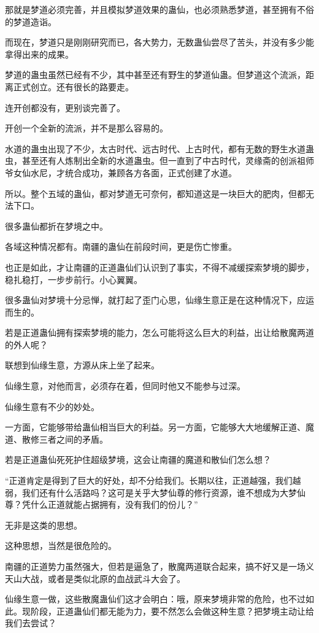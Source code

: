 \begin{this_body}
那就是梦道必须完善，并且模拟梦道效果的蛊仙，也必须熟悉梦道，甚至拥有不俗的梦道造诣。

而现在，梦道只是刚刚研究而已，各大势力，无数蛊仙尝尽了苦头，并没有多少能拿得出来的成果。

梦道的蛊虫虽然已经有不少，其中甚至还有野生的梦道仙蛊。但梦道这个流派，距离正式创立。还有很长的路要走。

连开创都没有，更别谈完善了。

开创一个全新的流派，并不是那么容易的。

水道的蛊虫出现了不少，太古时代、远古时代、上古时代，都有无数的野生水道蛊虫，甚至还有人炼制出全新的水道蛊虫。但一直到了中古时代，灵缘斋的创派祖师爷女仙水尼，才统合成功，兼顾各方各面，正式创建了水道。

所以。整个五域的蛊仙，都对梦道无可奈何，都知道这是一块巨大的肥肉，但都无法下口。

很多蛊仙都折在梦境之中。

各域这种情况都有。南疆的蛊仙在前段时间，更是伤亡惨重。

也正是如此，才让南疆的正道蛊仙们认识到了事实，不得不减缓探索梦境的脚步，稳扎稳打，一步步前行。小心翼翼。

很多蛊仙对梦境十分忌惮，就打起了歪门心思，仙缘生意正是在这种情况下，应运而生的。

若是正道蛊仙拥有探索梦境的能力，怎么可能将这么巨大的利益，出让给散魔两道的外人呢？

联想到仙缘生意，方源从床上坐了起来。

仙缘生意，对他而言，必须存在着，但同时他又不能参与过深。

仙缘生意有不少的妙处。

一方面，它能够带给蛊仙相当巨大的利益。另一方面，它能够大大地缓解正道、魔道、散修三者之间的矛盾。

若是正道蛊仙死死护住超级梦境，这会让南疆的魔道和散仙们怎么想？

“正道肯定是得到了巨大的好处，却不分给我们。长期以往，正道越强，我们越弱，我们还有什么活路吗？这可是关乎大梦仙尊的修行资源，谁不想成为大梦仙尊？凭什么正道就能占据拥有，没有我们的份儿？”

无非是这类的思想。

这种思想，当然是很危险的。

南疆的正道势力虽然强大，但若是逼急了，散魔两道联合起来，搞不好又是一场义天山大战，或者是类似北原的血战武斗大会了。

仙缘生意一做，这些散魔蛊仙们这才会明白：哦，原来梦境非常的危险，也不过如此。现阶段，正道蛊仙们都无能为力，要不然怎么会做这种生意？把梦境主动让给我们去尝试？


\end{this_body}
